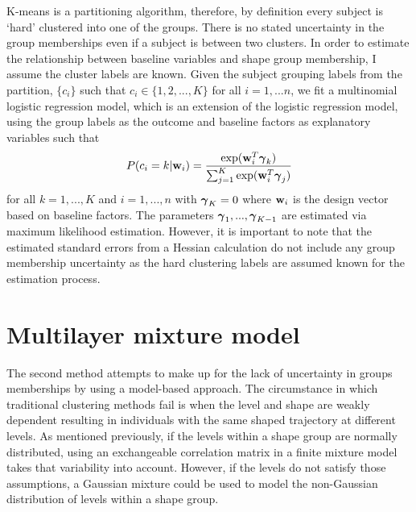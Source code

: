 K-means is a partitioning algorithm, therefore, by definition every subject is `hard' clustered into one of the groups. There is no stated uncertainty in the group memberships even if a subject is between two clusters. In order to estimate the relationship between baseline variables and shape group membership, I assume the cluster labels are known. Given the subject grouping labels from the partition, $\{c_{i}\}$ such that $c_{i}\in\{1,2,...,K\}$ for all $i=1,...n$, we fit a multinomial logistic regression model, which is an extension of the logistic regression model, using the group labels as the outcome and baseline factors as explanatory variables such that
$$P(c_{i} = k|\mathbf w_{i}) = \frac{\exp(\mathbf w_{i}^{T}\boldsymbol\gamma_{k})}{\sum_{j=1}^{K}\exp(\mathbf w_{i}^{T}\boldsymbol\gamma_{j})}$$
for all $k=1,...,K$ and $i=1,...,n$ with $\boldsymbol\gamma_{K}=0$ where $\mathbf w_{i}$ is the design vector based on baseline factors. The parameters $\boldsymbol\gamma_{1},...,\boldsymbol\gamma_{K-1}$ are estimated via maximum likelihood estimation. However, it is important to note that the estimated standard errors from a Hessian calculation do not include any group membership uncertainty  as the hard clustering labels are assumed known for the estimation process.


\section{Multilayer mixture model}\label{chp4:multi}
The second method attempts to make up for the lack of uncertainty in groups memberships by using a model-based approach. The circumstance in which traditional clustering methods fail is when the level and shape are weakly dependent resulting in individuals with the same shaped trajectory at different levels. As mentioned previously, if the levels within a shape group are normally distributed, using an exchangeable correlation matrix in a finite mixture model takes that variability into account. However, if the levels do not satisfy those assumptions, a Gaussian mixture could be used to model the non-Gaussian distribution of levels within a shape group. 

